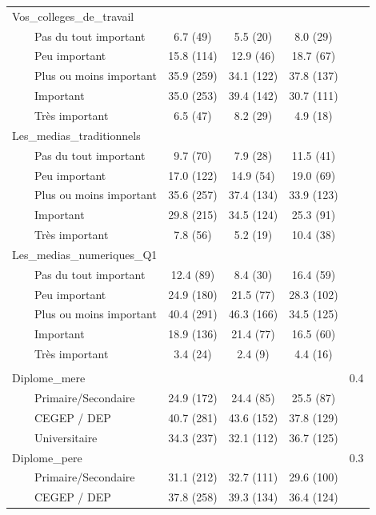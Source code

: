 \documentclass[
]{article}
\begin{document}
\begin{table}[!t]
\begin{tabular*}{\linewidth}{@{\extracolsep{\fill}}lcccc}
Vos\_colleges\_de\_travail &  &  &  &  \\ 
    Pas du tout important & 6.7 (49) & 5.5 (20) & 8.0 (29) &  \\ 
    Peu important & 15.8 (114) & 12.9 (46) & 18.7 (67) &  \\ 
    Plus ou moins important & 35.9 (259) & 34.1 (122) & 37.8 (137) &  \\ 
    Important & 35.0 (253) & 39.4 (142) & 30.7 (111) &  \\ 
    Très important & 6.5 (47) & 8.2 (29) & 4.9 (18) &  \\ 
Les\_medias\_traditionnels &  &  &  &  \\ 
    Pas du tout important & 9.7 (70) & 7.9 (28) & 11.5 (41) &  \\ 
    Peu important & 17.0 (122) & 14.9 (54) & 19.0 (69) &  \\ 
    Plus ou moins important & 35.6 (257) & 37.4 (134) & 33.9 (123) &  \\ 
    Important & 29.8 (215) & 34.5 (124) & 25.3 (91) &  \\ 
    Très important & 7.8 (56) & 5.2 (19) & 10.4 (38) &  \\ 
Les\_medias\_numeriques\_Q1 &  &  &  &  \\ 
    Pas du tout important & 12.4 (89) & 8.4 (30) & 16.4 (59) &  \\ 
    Peu important & 24.9 (180) & 21.5 (77) & 28.3 (102) &  \\ 
    Plus ou moins important & 40.4 (291) & 46.3 (166) & 34.5 (125) &  \\ 
    Important & 18.9 (136) & 21.4 (77) & 16.5 (60) &  \\ 
    Très important & 3.4 (24) & 2.4 (9) & 4.4 (16) &  \\ 
\midrule\addlinespace[2.5pt]
\multicolumn{5}{l}{Parents} \\[2.5pt] 
\midrule\addlinespace[2.5pt]
Diplome\_mere &  &  &  & 0.4 \\ 
    Primaire/Secondaire & 24.9 (172) & 24.4 (85) & 25.5 (87) &  \\ 
    CEGEP / DEP & 40.7 (281) & 43.6 (152) & 37.8 (129) &  \\ 
    Universitaire & 34.3 (237) & 32.1 (112) & 36.7 (125) &  \\ 
Diplome\_pere &  &  &  & 0.3 \\ 
    Primaire/Secondaire & 31.1 (212) & 32.7 (111) & 29.6 (100) &  \\ 
    CEGEP / DEP & 37.8 (258) & 39.3 (134) & 36.4 (124) &  \\ 

\end{tabular*}
\end{table}
\end{document}
